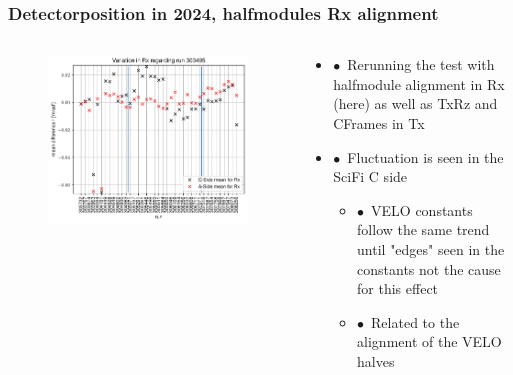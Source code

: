 \documentclass[aspectratio=1610, 12pt, xcolor=dvipsnames]{beamer}
\begin{document}
\begin{frame}\frametitle{Detectorposition in 2024, halfmodules Rx alignment}
  \begin{columns}
    \begin{column}[c]{0.48\textwidth}
      \begin{figure}
        \centering
        \includegraphics[width=\textwidth]{plots/2025_plots_goettingen/scifi_stability_halfmodules_outdir_jan2025/half/stabi_test_Rx_half.pdf}
      \end{figure}
    \end{column}
    \begin{column}[c]{0.48\textwidth}
      \begin{itemize}
        \item $\bullet$\, Rerunning the test with halfmodule alignment in Rx (here) as well as TxRz and CFrames in Tx
        \item $\bullet$\, Fluctuation is seen in the SciFi C side
        \begin{itemize}
          \item $\bullet$\, VELO constants follow the same trend until "edges" seen in the constants \to not the cause for this effect
          \item $\bullet$\, Related to the alignment of the VELO halves
        \end{itemize}
      \end{itemize}
    \end{column}
  \end{columns}
\end{frame}
\end{document}
